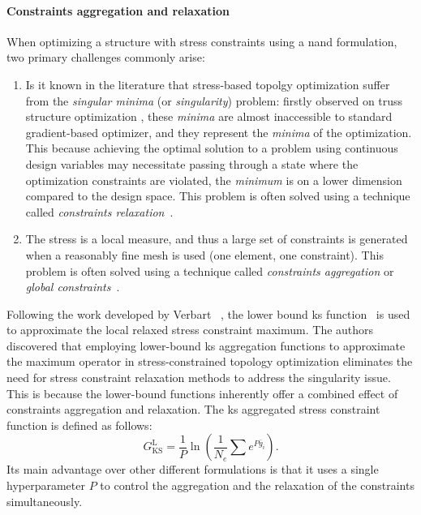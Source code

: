 \paragraph{Constraints aggregation and relaxation}
When optimizing a structure with stress constraints using a \gls{nand} formulation, two primary challenges commonly arise:
\begin{enumerate}[label=(\roman*)]
    \item Is it known in the literature \cite{rozvany_design-dependent_2001,stolpe_models_2003} that stress-based topolgy optimization suffer from the \textit{singular minima} (or \textit{singularity}) problem: firstly observed on truss structure optimization \cite{sved_structural_1968}, these \textit{minima} are almost inaccessible to standard gradient-based optimizer, and they represent the \textit{minima} of the optimization. This because achieving the optimal solution to a problem using continuous design variables may necessitate passing through a state where the optimization constraints are violated, \ie the \textit{minimum} is on a lower dimension compared to the design space. This problem is often solved using a technique called \textit{constraints relaxation}~.

    \item The stress is a local measure, and thus a large set of constraints is generated when a reasonably fine mesh is used (one element, one constraint). This problem is often solved using a technique called \textit{constraints aggregation} or \textit{global constraints}~.
\end{enumerate} 

Following the work developed by Verbart \etal~, the lower bound \gls{ks} function~ is used to approximate the local relaxed stress constraint maximum. The authors discovered that employing lower-bound \gls{ks} aggregation functions to approximate the maximum operator in stress-constrained topology optimization eliminates the need for stress constraint relaxation methods to address the singularity issue. This is because the lower-bound functions inherently offer a combined effect of constraints aggregation and relaxation. The \gls{ks} aggregated stress constraint function is defined as follows:
\begin{equation} 
    G_{\text{KS}}^\text{L} = \frac{1}{P} \ln{\left( \frac{1}{N_e} \sum e^{{P}\bar{g}_i} \right)}.
    \label{eq:03_gksl}
\end{equation}
Its main advantage over other different formulations is that it uses a single hyperparameter $P$ to control the aggregation and the relaxation of the constraints simultaneously.

